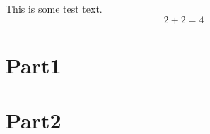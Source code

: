 This is some test text.
\begin{equation}
  2+2 = 4
\end{equation}


\section{Part1}
\lipsum[1-2]
\section{Part2}
\lipsum[3-4]
